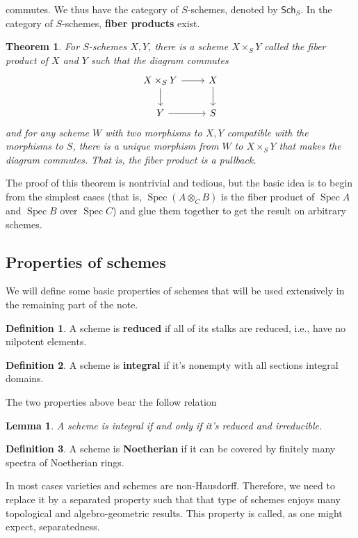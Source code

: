 \documentclass[12pt]{article}
\newtheorem{theorem}{Theorem}[section]
\newtheorem{lemma}{Lemma}[section]
\theoremstyle{remark}
\theoremstyle{definition}
\newtheorem{definition}{Definition}[section]
\newcommand{\Spec}[0]{\operatorname{Spec}}
\newcommand{\Sch}[0]{\mathsf{Sch}}
\begin{document}
    commutes. We thus have the category of $S$-schemes, denoted by $\Sch_S$. In the category of $S$-schemes, \textbf{fiber products} exist.
    \begin{theorem}
        For $S$-schemes $X,Y$, there is a scheme $X\times_S Y$ called the fiber product of $X$ and $Y$ such that the diagram commutes
        \[\begin{tikzcd}
            X\times_S Y \arrow[r] \arrow[d] & X \arrow[d] \\
            Y \arrow[r]                     & S          
            \end{tikzcd}\]
        and for any scheme $W$ with two morphisms to $X, Y$ compatible with the morphisms to $S$, there is a unique morphism from $W$ to $X\times_S Y$ that makes the diagram commutes. That is, the fiber product is a pullback.
    \end{theorem}
    The proof of this theorem is nontrivial and tedious, but the basic idea is to begin from the simplest cases (that is, $\Spec(A\otimes_C B)$ is the fiber product of $\Spec A$ and $\Spec B$ over $\Spec C$) and glue them together to get the result on arbitrary schemes.
    \subsection{Properties of schemes}
    We will define some basic properties of schemes that will be used extensively in the remaining part of the note.
    \begin{definition}
        A scheme is \textbf{reduced} if all of its stalks are reduced, i.e., have no nilpotent elements.
    \end{definition}
    \begin{definition}
        A scheme is \textbf{integral} if it's nonempty with all sections integral domains.
    \end{definition}
    The two properties above bear the follow relation
    \begin{lemma}
        A scheme is integral if and only if it's reduced and irreducible.
    \end{lemma}
    \begin{definition}
        A scheme is \textbf{Noetherian} if it can be covered by finitely many spectra of Noetherian rings.
    \end{definition}
    In most cases varieties and schemes are non-Hausdorff. Therefore, we need to replace it by a separated property such that that type of schemes enjoys many topological and algebro-geometric results. This property is called, as one might expect, separatedness.
\end{document}
